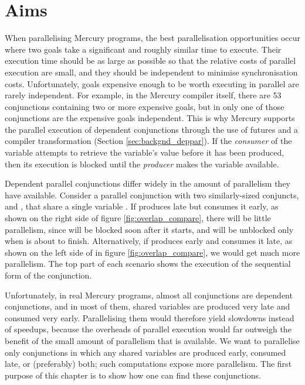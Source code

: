 \section{Aims}
\label{sec:overlap_aims}

When parallelising Mercury programs,
the best parallelisation opportunities occur
where two goals take a significant and roughly similar time to execute.
Their execution time should be as large as possible
so that the relative costs of parallel execution are small,
and they should be independent to minimise synchronisation costs.
Unfortunately, goals expensive enough to be worth executing in parallel
are rarely independent.
For example, in the Mercury compiler itself,
there are 53 conjunctions containing two or more expensive goals,
but in only one of those conjunctions are the expensive goals independent.
This is why Mercury supports the parallel execution of dependent conjunctions
through the use of futures and a compiler transformation
\citep{wang:2011:dep-par,wang:2006:hons} (Section \ref{sec:backgnd_deppar}).
If the \emph{consumer} of the variable attempts to retrieve the variable's value
before it has been produced, then its execution is blocked
until the \emph{producer} makes the variable available.


Dependent parallel conjunctions differ widely
in the amount of parallelism they have available.
Consider a parallel conjunction with two similarly-sized conjuncts,
 and , that share a single variable .
If  produces  late but  consumes it early,
as shown on the right side of figure \ref{fig:overlap_compare},
there will be little parallelism,
since  will be blocked soon after it starts,
and will be unblocked only when  is about to finish.
Alternatively, if  produces  early
and  consumes it late,
as shown on the left side of in figure \ref{fig:overlap_compare},
we would get much more parallelism.
The top part of each scenario
shows the execution of the sequential form of the conjunction.

Unfortunately, in real Mercury programs,
almost all conjunctions are dependent conjunctions,
and in most of them,
shared variables are produced very late and consumed very early.
Parallelising them would therefore yield slowdowns instead of speedups,
because the overheads of parallel execution would far outweigh the
benefit of the small amount of parallelism that is available.
We want to parallelise only conjunctions
in which any shared variables are produced early, consumed late,
or (preferably) both;
such computations expose more parallelism.
The first purpose of this chapter is to show how one can find these conjunctions.

